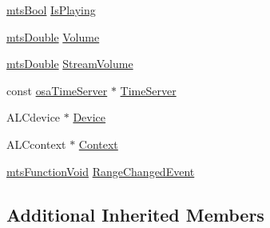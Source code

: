 \begin{DoxyCompactItemize}
\item 
\hyperlink{mts_generic_object_proxy_8h_ae2e26261f1874d4aa4ee374ece7646bd}{mts\-Bool} \hyperlink{classmts_open_a_l_play_a0d76e2f8d1f2223b008550b061954162}{Is\-Playing}
\item 
\hyperlink{mts_generic_object_proxy_8h_a31e76b0190a8d3f9838626cd7b47bd75}{mts\-Double} \hyperlink{classmts_open_a_l_play_aaebfc63c5f4cc5d7b6ce8cd803ddfef2}{Volume}
\item 
\hyperlink{mts_generic_object_proxy_8h_a31e76b0190a8d3f9838626cd7b47bd75}{mts\-Double} \hyperlink{classmts_open_a_l_play_a2def7fb60be825801cbf4a4e7862d7bc}{Stream\-Volume}
\item 
const \hyperlink{classosa_time_server}{osa\-Time\-Server} $\ast$ \hyperlink{classmts_open_a_l_play_ae7df403a9ca556114dcc51164ac96fb4}{Time\-Server}
\item 
A\-L\-Cdevice $\ast$ \hyperlink{classmts_open_a_l_play_a788253f5c250b5ae925377ff99d9f464}{Device}
\item 
A\-L\-Ccontext $\ast$ \hyperlink{classmts_open_a_l_play_a47760c4ccad48177879a14ae4ae7d01f}{Context}
\item 
\hyperlink{classmts_function_void}{mts\-Function\-Void} \hyperlink{classmts_open_a_l_play_ab558a1c0122897729cc801df40bd0760}{Range\-Changed\-Event}
\end{DoxyCompactItemize}
\subsection*{Additional Inherited Members}


